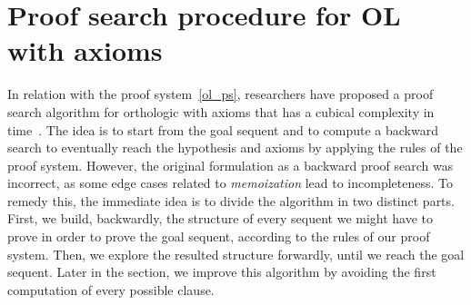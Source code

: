 \documentclass[a4paper, 11pt]{article}
\newtheorem{example}[theorem]{Example}
\begin{document}
    \section{Proof search procedure for OL with axioms}
    In relation with the proof system~\ref{ol_ps}, researchers have proposed a proof search algorithm 
    for orthologic with axioms that has a cubical complexity in time~\cite{10.1145/3632881}. The idea is
    to start from the goal sequent and to compute a backward search to eventually reach the hypothesis 
    and axioms by applying the rules of the proof system. However, the original formulation as a 
    backward proof search was incorrect, as some edge cases related to \textit{memoization} lead to 
    incompleteness.
    To remedy this, the immediate idea is to divide the algorithm in two distinct parts. First,
    we build, backwardly, the structure of every sequent we might have to prove in order to prove the 
    goal sequent, according to the rules of our proof system. Then, we explore the resulted structure
    forwardly, until we reach the goal sequent. Later in the section, we improve this algorithm by 
    avoiding the first computation of every possible clause.
\end{document}
